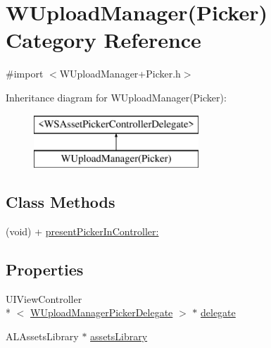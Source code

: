 \hypertarget{category_w_upload_manager_07_picker_08}{\section{W\-Upload\-Manager(Picker) Category Reference}
\label{category_w_upload_manager_07_picker_08}
}


{\ttfamily \#import $<$W\-Upload\-Manager+\-Picker.\-h$>$}

Inheritance diagram for W\-Upload\-Manager(Picker)\-:\begin{figure}[H]
\begin{center}
\leavevmode
\includegraphics[height=2.000000cm]{category_w_upload_manager_07_picker_08}
\end{center}
\end{figure}
\subsection*{Class Methods}
\begin{DoxyCompactItemize}
\item 
(void) + \hyperlink{category_w_upload_manager_07_picker_08_ae67580af774da79b22b251d2cc59c6bf}{present\-Picker\-In\-Controller\-:}
\end{DoxyCompactItemize}
\subsection*{Properties}
\begin{DoxyCompactItemize}
\item 
U\-I\-View\-Controller\\*
$<$ \hyperlink{protocol_w_upload_manager_picker_delegate-p}{W\-Upload\-Manager\-Picker\-Delegate} $>$ $\ast$ \hyperlink{category_w_upload_manager_07_picker_08_a870f35ee39fa92fd49939ea31777bada}{delegate}
\item 
A\-L\-Assets\-Library $\ast$ \hyperlink{category_w_upload_manager_07_picker_08_a30094622f4a5143ba72ea9fa61c1d7cf}{assets\-Library}
\end{DoxyCompactItemize}


